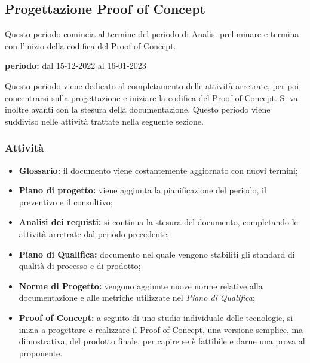 \subsection{Progettazione Proof of Concept}
Questo periodo comincia al termine del periodo di Analisi preliminare e termina con l'inizio della codifica del Proof of Concept.\\
\begin{center}
\textbf{periodo:} dal 15-12-2022 al 16-01-2023\\
\end{center}
Questo periodo viene dedicato al completamento delle attività arretrate, per poi concentrarsi sulla 
progettazione e iniziare la codifica del Proof of Concept. Si va inoltre avanti con la stesura 
della documentazione. Questo periodo viene suddiviso nelle attività trattate nella seguente sezione.

\subsubsection{Attività}
\begin{itemize}
\item \textbf{Glossario:} il documento viene costantemente aggiornato con nuovi termini;
\item \textbf{Piano di progetto:} viene aggiunta la pianificazione del periodo, il preventivo e il consultivo;  
\item \textbf{Analisi dei requisti:} si continua la stesura del documento, completando le attività arretrate dal periodo precedente;
\item \textbf{Piano di Qualifica:} documento nel quale vengono stabiliti gli standard di qualità di processo e di prodotto;
\item \textbf{Norme di Progetto:} vengono aggiunte nuove norme relative alla documentazione e alle metriche utilizzate nel \textit{Piano di Qualifica};
\item \textbf{Proof of Concept:} a seguito di uno studio individuale delle tecnologie, si inizia a progettare e realizzare il Proof of Concept, una versione semplice, ma dimostrativa, del prodotto finale, per 
capire se è fattibile e darne una prova al proponente.
\end{itemize}

